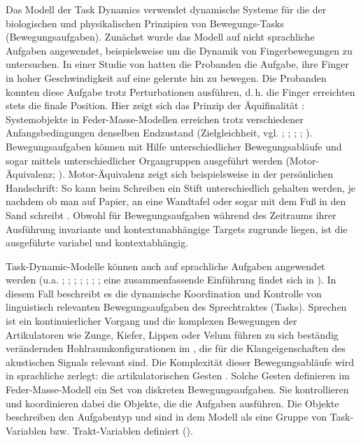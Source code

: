 Das Modell der Task Dynamics verwendet dynamische Systeme für die  der biologischen und physikalischen Prinzipien von Bewegungs-Tasks (Bewegungsaufgaben). Zunächst wurde das Modell auf nicht sprachliche Aufgaben angewendet, beispielsweise um die Dynamik von Fingerbewegungen zu untersuchen. In einer Studie von \citet{Kelso1980} hatten die Probanden die Aufgabe, ihre Finger in hoher Geschwindigkeit auf eine gelernte  hin zu bewegen. Die Probanden konnten diese Aufgabe trotz Perturbationen ausführen, d.\,h. die Finger erreichten stets die finale Position. Hier zeigt sich das Prinzip der Äquifinalität \citep{Bertalanffy1968}: Systemobjekte in Feder-Masse-Modellen erreichen trotz verschiedener Anfangsbedingungen denselben Endzustand (Zielgleichheit, vgl. \citealt{Browman1986}; \citealt{Saltzman1989}; \citealt{Hawkins1992}; \citealt{Pouplier2011a}; \citealt{BrowmanGoldstein}). Bewegungsaufgaben können mit Hilfe unterschiedlicher Bewegungsabläufe und sogar mittels unterschiedlicher Organgruppen ausgeführt werden (Motor-Äquivalenz; \citealt{Hebb1949}). Motor-Äquivalenz zeigt sich beispielsweise in der persönlichen Handschrift: So kann beim Schreiben ein Stift unterschiedlich gehalten werden, je nachdem ob man auf Papier, an eine Wandtafel oder sogar mit dem Fuß in den Sand schreibt \citep{Wing2000}. Obwohl für Bewegungsaufgaben während des Zeitraums ihrer Ausführung invariante und kontextunabhängige Targets zugrunde liegen, ist die ausgeführte  variabel und kontextabhängig. 

Task-Dynamic-Modelle können auch auf sprachliche Aufgaben angewendet werden (u.a. \citealt{Fowler1977}; \citealt{Fowler1980}; \citealt{Saltzman1986}; \citealt{Browman1986}; \citealt{Browman1988}; \citealt{Saltzman1987}; \citealt{Saltzman1989}; eine zusammenfassende Einführung findet sich in \citealt{Hawkins1992}). In diesem Fall beschreibt es die dynamische Koordination und Kontrolle von linguistisch relevanten Bewegungsaufgaben des Sprechtraktes (Tasks). Sprechen ist ein kontinuierlicher Vorgang und die komplexen Bewegungen der Artikulatoren wie Zunge, Kiefer, Lippen oder Velum führen zu sich beständig verändernden Hohlraumkonfigurationen im , die für die Klangeigenschaften des akustischen Signals relevant sind. Die Komplexität dieser Bewegungsabläufe wird in sprachliche  zerlegt: die artikulatorischen Gesten \citep{Saltzman1989}. Solche Gesten definieren im Feder-Masse-Modell ein Set von diskreten Bewegungsaufgaben. Sie kontrollieren und koordinieren dabei die Objekte, die die Aufgaben ausführen. Die Objekte beschreiben den Aufgabentyp und sind in dem Modell als eine Gruppe von Task-Variablen bzw. Trakt-Variablen definiert (\citealt[vgl.][]{Hawkins1992}). 

